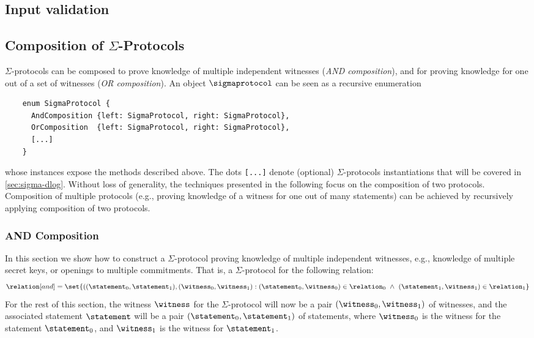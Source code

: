 \documentclass[11pt]{article}
\begin{document}
\subsection{Input validation}

\subsection{Composition of $\Sigma$-Protocols}
\label{sec:composition}
\label{sec:or-comp}
\label{sec:and-comp}
  $\Sigma$-protocols can be composed to prove knowledge of multiple independent witnesses (\emph{AND composition}), and for proving knowledge for one out of a set of witnesses (\emph{OR composition}). An object $\sigmaprotocol$ can be seen as a recursive enumeration

  \begin{verbatim}
    enum SigmaProtocol {
      AndComposition {left: SigmaProtocol, right: SigmaProtocol},
      OrComposition  {left: SigmaProtocol, right: SigmaProtocol},
      [...]
    }
  \end{verbatim}
whose instances expose the methods described above.
The dots \texttt{[...]} denote (optional) $\Sigma$-protocols instantiations that will be covered in \cref{sec:sigma-dlog}.
  Without loss of generality, the techniques presented in the following focus on the composition of two protocols.
  Composition of multiple protocols (e.g., proving knowledge of a witness for one out of many statements) can be achieved by recursively applying composition of two protocols.

  \subsubsection{AND Composition}
  In this section we show how to construct a $\Sigma$-protocol proving knowledge of multiple independent witnesses, e.g., knowledge of multiple secret keys, or openings to multiple commitments.
  That is, a $\Sigma$-protocol for the following relation:
\[
  \relation[and] = \set{
    ((\statement_0,\statement_1),(\witness_0,\witness_1) : (\statement_0,\witness_0)\in \relation_0 ~\land~ (\statement_1,\witness_1)\in\relation_1}
\]
For the rest of this section, the witness $\witness$ for the $\Sigma$-protocol will now be a pair $(\witness_0, \witness_1)$ of witnesses, and the associated statement $\statement$ will be a pair $(\statement_0, \statement_1)$ of statements, where $\witness_0$ is the witness for the statement $\statement_0$, and $\witness_1$ is the witness for $\statement_1$.
\end{document}
